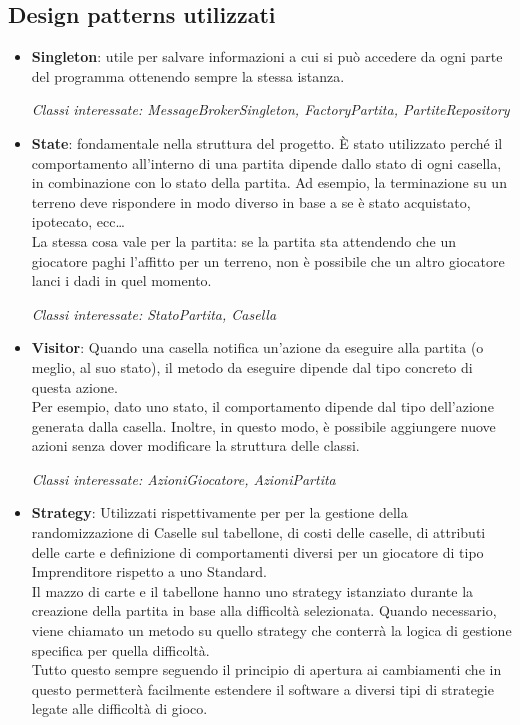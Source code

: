 \documentclass{article}
\begin{document}
\subsection{Design patterns utilizzati}
    \begin{itemize}
        \item \textbf{Singleton}: utile per salvare informazioni a cui si può accedere da ogni parte del programma ottenendo sempre la stessa istanza. 
        
        
        \textit{Classi interessate: MessageBrokerSingleton, FactoryPartita, PartiteRepository} 
        
        
        \item \textbf{State}: fondamentale nella struttura del progetto. È stato utilizzato perché il comportamento all'interno di una partita dipende dallo stato di ogni casella, in combinazione con lo stato della partita. Ad esempio, la terminazione su un terreno deve rispondere in modo diverso in base a se è stato acquistato, ipotecato, ecc… \\ La stessa cosa vale per la partita: se la partita sta attendendo che un giocatore paghi l'affitto per un terreno, non è possibile che un altro giocatore lanci i dadi in quel momento. 
        
        \textit{Classi interessate: StatoPartita, Casella} 
        
        
        \item \textbf{Visitor}: Quando una casella notifica un'azione da eseguire alla partita (o meglio, al suo stato), il metodo da eseguire dipende dal tipo concreto di questa azione. \\Per esempio, dato uno stato, il comportamento dipende dal tipo dell'azione generata dalla casella. Inoltre, in questo modo, è possibile aggiungere nuove azioni senza dover modificare la struttura delle classi.
        
        \textit{Classi interessate: AzioniGiocatore, AzioniPartita} 
        
        
        \item \textbf{Strategy}: Utilizzati rispettivamente per per la gestione della randomizzazione di Caselle sul tabellone, di costi delle caselle, di attributi delle carte e definizione di comportamenti diversi per un giocatore di tipo Imprenditore rispetto a uno Standard. 
        \\Il mazzo di carte e il tabellone hanno uno strategy istanziato durante la creazione della partita in base alla difficoltà selezionata. Quando necessario, viene chiamato un metodo su quello strategy che conterrà la logica di gestione specifica per quella difficoltà.
        \\Tutto questo sempre seguendo il principio di apertura ai cambiamenti che in questo permetterà facilmente estendere il software a diversi tipi di strategie legate alle difficoltà di gioco.
        

\end{itemize}
\end{document}
